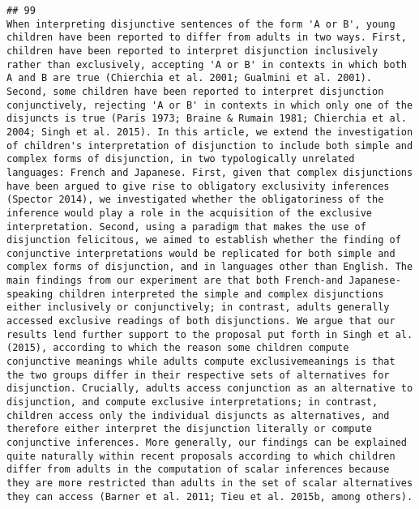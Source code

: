 \documentclass[
  english,
  man]{apa6}
\begin{document}
\begin{verbatim}
## 99                                                                                                                                        When interpreting disjunctive sentences of the form 'A or B', young children have been reported to differ from adults in two ways. First, children have been reported to interpret disjunction inclusively rather than exclusively, accepting 'A or B' in contexts in which both A and B are true (Chierchia et al. 2001; Gualmini et al. 2001). Second, some children have been reported to interpret disjunction conjunctively, rejecting 'A or B' in contexts in which only one of the disjuncts is true (Paris 1973; Braine & Rumain 1981; Chierchia et al. 2004; Singh et al. 2015). In this article, we extend the investigation of children's interpretation of disjunction to include both simple and complex forms of disjunction, in two typologically unrelated languages: French and Japanese. First, given that complex disjunctions have been argued to give rise to obligatory exclusivity inferences (Spector 2014), we investigated whether the obligatoriness of the inference would play a role in the acquisition of the exclusive interpretation. Second, using a paradigm that makes the use of disjunction felicitous, we aimed to establish whether the finding of conjunctive interpretations would be replicated for both simple and complex forms of disjunction, and in languages other than English. The main findings from our experiment are that both French-and Japanese-speaking children interpreted the simple and complex disjunctions either inclusively or conjunctively; in contrast, adults generally accessed exclusive readings of both disjunctions. We argue that our results lend further support to the proposal put forth in Singh et al. (2015), according to which the reason some children compute conjunctive meanings while adults compute exclusivemeanings is that the two groups differ in their respective sets of alternatives for disjunction. Crucially, adults access conjunction as an alternative to disjunction, and compute exclusive interpretations; in contrast, children access only the individual disjuncts as alternatives, and therefore either interpret the disjunction literally or compute conjunctive inferences. More generally, our findings can be explained quite naturally within recent proposals according to which children differ from adults in the computation of scalar inferences because they are more restricted than adults in the set of scalar alternatives they can access (Barner et al. 2011; Tieu et al. 2015b, among others).

\end{verbatim}
\end{document}
